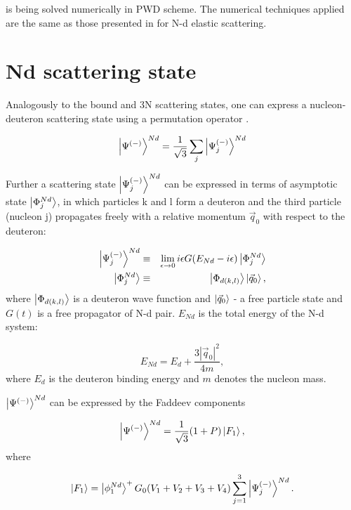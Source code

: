      is being solved numerically in PWD scheme. The numerical techniques applied are the same as
    those presented in \cite{GLOCKLE_report_1996} for N-d elastic scattering.



\section{Nd scattering state}
\label{nd_state}

    Analogously to the bound and 3N scattering states, one can express a nucleon-deuteron
    scattering state
    using a permutation operator .

    \begin{equation}
        \ket{\Psi^{(-)}}^{Nd} = \frac{1}{\sqrt{3}}\sum_j\ket{\Psi^{(-)}_j}^{Nd}    
    \end{equation}

    Further a scattering state $\ket{\Psi^{(-)}_j}^{Nd}$ can be expressed
    in terms of asymptotic state $\ket{\Phi^{Nd}_j}$, in which particles
    k and l form a deuteron and the third particle (nucleon j)
     propagates freely with a relative momentum $\vec{q}_0$ with 
    respect to the deuteron:

    \begin{eqnarray}
        \ket{\Psi^{(-)}_j}^{Nd} &\equiv& \lim_{\epsilon \rightarrow 0} 
        i \epsilon G(E_{Nd} - i\epsilon)\ket{\Phi^{Nd}_j}\\
        \ket{\Phi^{Nd}_j} &\equiv& \ket{\Phi_{d(k,l)}}\ket{\vec{q}_0},
    \end{eqnarray}
    where $\ket{\Phi_{d(k,l)}}$ is a deuteron wave function and 
    $\ket{\vec{q}_0}$ - a free particle state and $G(t)$ is 
    a free propagator of N-d pair. 
    $E_{Nd}$ is the total energy of the N-d system:

    \begin{equation}
        E_{Nd} = E_d + \frac{3 |\vec{q}_0|^2}{4m},
    \end{equation}
    where $E_d$ is the deuteron binding energy and $m$ denotes the nucleon mass. 

    $\ket{\Psi^{(-)}}^{Nd}$ can be expressed by the Faddeev components

    \begin{equation}
        \ket{\Psi^{(-)}}^{Nd} = \frac{1}{\sqrt{3}} (1+P) \ket{F_1},
    \end{equation}
    where 
    
    \begin{equation}
        \ket{F_1} = \ket{\phi_1^{Nd}}^{+} G_0 (V_1 + V_2 + V_3 + V_4) 
        \sum_{j=1}^3 \ket{\Psi_j^{(-)}}^{Nd}.
    \end{equation}

